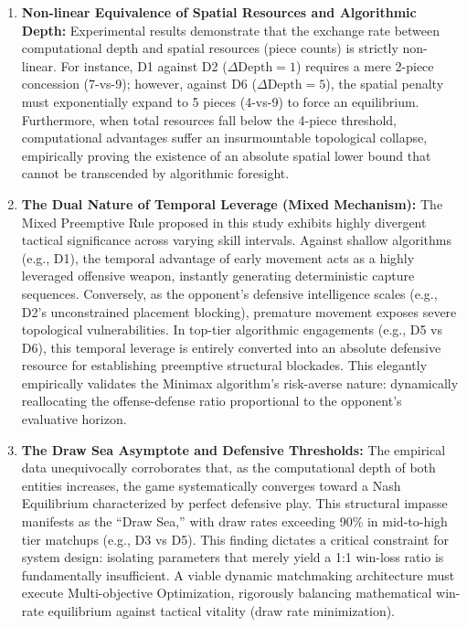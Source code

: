 \begin{enumerate}
    \item \textbf{Non-linear Equivalence of Spatial Resources and Algorithmic Depth:} 
    Experimental results demonstrate that the exchange rate between computational depth and spatial resources (piece counts) is strictly non-linear. For instance, D1 against D2 ($\Delta\text{Depth} = 1$) requires a mere 2-piece concession (7-vs-9); however, against D6 ($\Delta\text{Depth} = 5$), the spatial penalty must exponentially expand to 5 pieces (4-vs-9) to force an equilibrium. Furthermore, when total resources fall below the 4-piece threshold, computational advantages suffer an insurmountable topological collapse, empirically proving the existence of an absolute spatial lower bound that cannot be transcended by algorithmic foresight.

    \item \textbf{The Dual Nature of Temporal Leverage (Mixed Mechanism):} 
    The Mixed Preemptive Rule proposed in this study exhibits highly divergent tactical significance across varying skill intervals. Against shallow algorithms (e.g., D1), the temporal advantage of early movement acts as a highly leveraged offensive weapon, instantly generating deterministic capture sequences. Conversely, as the opponent's defensive intelligence scales (e.g., D2's unconstrained placement blocking), premature movement exposes severe topological vulnerabilities. In top-tier algorithmic engagements (e.g., D5 vs D6), this temporal leverage is entirely converted into an absolute defensive resource for establishing preemptive structural blockades. This elegantly empirically validates the Minimax algorithm's risk-averse nature: dynamically reallocating the offense-defense ratio proportional to the opponent's evaluative horizon.

    \item \textbf{The Draw Sea Asymptote and Defensive Thresholds:} 
    The empirical data unequivocally corroborates that, as the computational depth of both entities increases, the game systematically converges toward a Nash Equilibrium characterized by perfect defensive play. This structural impasse manifests as the ``Draw Sea,''
    with draw rates exceeding 90\% in mid-to-high tier matchups (e.g., D3 vs D5). This finding dictates a critical constraint for system design: isolating parameters that merely yield a 1:1 win-loss ratio is fundamentally insufficient. A viable dynamic matchmaking architecture must execute Multi-objective Optimization, rigorously balancing mathematical win-rate equilibrium against tactical vitality (draw rate minimization).
\end{enumerate}

